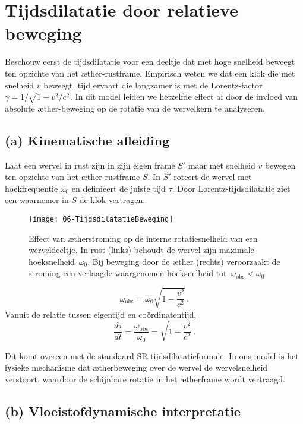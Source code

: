 \section{Tijdsdilatatie door relatieve beweging}

Beschouw eerst de tijdsdilatatie voor een deeltje dat met hoge snelheid beweegt ten opzichte van het æther-rustframe. Empirisch weten we dat een klok die met snelheid $v$ beweegt, tijd ervaart die langzamer is met de Lorentz-factor $\gamma = 1/\sqrt{1 - v^2/c^2}$. In dit model leiden we hetzelfde effect af door de invloed van absolute æther-beweging op de rotatie van de wervelkern te analyseren.

\subsection*{(a) Kinematische afleiding}

Laat een wervel in rust zijn in zijn eigen frame $S'$ maar met snelheid $v$ bewegen ten opzichte van het æther-rustframe $S$. In $S'$ roteert de wervel met hoekfrequentie $\omega_0$ en definieert de juiste tijd $\tau$. Door Lorentz-tijdsdilatatie ziet een waarnemer in $S$ de klok vertragen:

\begin{figure}[htbp]
    \centering
    \texttt{[image: 06-TijdsdilatatieBeweging]}
    \caption{Effect van ætherstroming op de interne rotatiesnelheid van een werveldeeltje. In rust (links) behoudt de wervel zijn maximale hoeksnelheid~$\omega_0$. Bij beweging door de æther (rechts) veroorzaakt de stroming een verlaagde waargenomen hoeksnelheid tot~$\omega_{\mathrm{obs}} < \omega_0$.}
    \label{fig:TijdsdilatatieBeweging}
\end{figure}

\[
    \omega_{\text{obs}} = \omega_0 \sqrt{1 - \frac{v^2}{c^2}} \,.
\]
Vanuit de relatie tussen eigentijd en coördinatentijd,
\[
    \frac{d\tau}{dt} = \frac{\omega_{\text{obs}}}{\omega_0} = \sqrt{1 - \frac{v^2}{c^2}} \,. \tag{2}
\]

Dit komt overeen met de standaard SR-tijdsdilatatieformule. In ons model is het fysieke mechanisme dat ætherbeweging over de wervel de wervelsnelheid verstoort, waardoor de schijnbare rotatie in het ætherframe wordt vertraagd.

\subsection*{(b) Vloeistofdynamische interpretatie}


